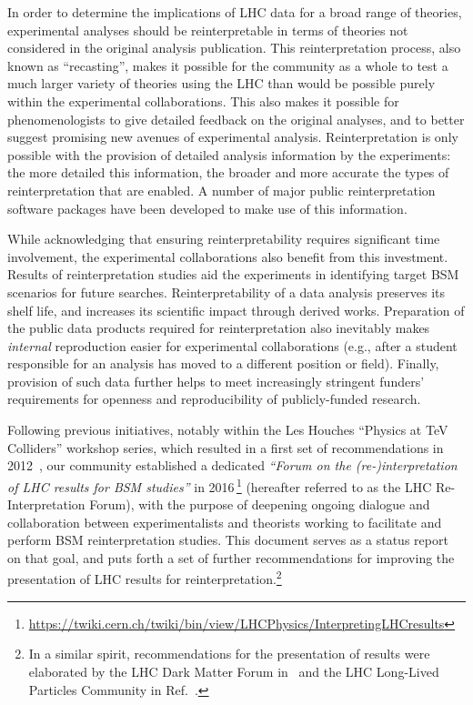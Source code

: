 \documentclass[a4paper,aps,prd,longbibliography,notitlepage,showpacs,amsmath,amssymb,superscriptaddress,nofootinbib,floatfix,11pt,preprintnumbers]{revtex4-1-mod}
\newcommand{\eg}{e.g.\xspace}
\renewcommand{\emph}[1]{\textit{#1}}
\begin{document}
In order to determine the implications of LHC data for a broad range of theories, experimental analyses should be reinterpretable in terms of theories not considered in the original analysis publication.   This reinterpretation process, also known as ``recasting'', makes it possible for the community as a whole to test a much larger variety of theories using the LHC than would be possible purely within the experimental collaborations.  This also makes it possible for phenomenologists to give detailed feedback on the original analyses, and to better suggest promising new avenues of experimental analysis. Reinterpretation is only possible with the provision of detailed analysis information by the experiments: the more detailed this information, the broader and more accurate the types of reinterpretation that are enabled. A number of major public reinterpretation software packages have been developed to make use of this information.

While acknowledging that ensuring reinterpretability requires significant time involvement, the experimental collaborations also benefit from this investment.
Results of reinterpretation studies aid the experiments in identifying target BSM scenarios for future searches.
Reinterpretability of a data analysis preserves its shelf life, and increases its scientific impact through derived works.
Preparation of the public data products required for reinterpretation also inevitably makes \emph{internal} reproduction easier for experimental collaborations (\eg, after a student responsible for an analysis has moved to a different position or field).  Finally, provision of such data further helps to meet increasingly stringent funders' requirements for openness and reproducibility of publicly-funded research.

Following previous initiatives, notably within the Les Houches ``Physics at TeV Colliders'' workshop series, which resulted in a first set of recommendations in 2012~\cite{Brooijmans:2012yi,Kraml:2012sg},
our community established a dedicated \emph{``Forum on the (re-)interpretation of LHC results for BSM studies''} in 2016\,\footnote{\url{https://twiki.cern.ch/twiki/bin/view/LHCPhysics/InterpretingLHCresults}} (hereafter referred to as the LHC Re-Interpretation Forum), with the purpose of deepening ongoing dialogue and collaboration between experimentalists and theorists working to facilitate and perform BSM reinterpretation studies.
This document serves as a status report on that goal, and puts forth a set of further recommendations for improving the presentation of LHC results for reinterpretation.\footnote{In a similar spirit,  recommendations for the presentation of results were elaborated by the LHC Dark Matter Forum in~\cite{Abercrombie:2015wmb} and the LHC Long-Lived Particles Community in Ref.~\cite{Alimena:2019zri}.}
\end{document}
